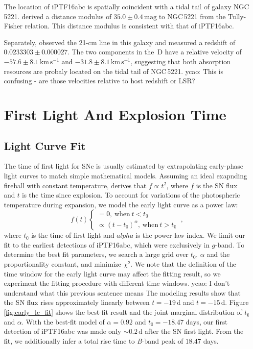 \documentclass[twocolumn]{aastex61}
\newcommand{\ycao}[1]{{\color{red} ycao: {#1}}}
\begin{document}
The location of iPTF16abc is spatially coincident with a tidal tail of
galaxy NGC\,5221. \citet{2007A&A...465...71T} derived a distance
modulus of $35.0\pm0.4\,\textrm{mag}$ to NGC\,5221 from the Tully-Fisher
relation. This distance modulus is consistent with that of iPTF16abc.

Separately, \citet{1998A&AS..130..333T} observed the 21-cm line in
this galaxy and measured a redshift of $0.0233303\pm0.000027$.  The
two components in the \,D have a relative velocity of
$-57.6\pm8.1\,\textrm{km}\,\textrm{s}^{-1}$ and
$-31.8\pm8.1\,\textrm{km}\,\textrm{s}^{-1}$, suggesting that both
absorption resources are probaly located on the tidal tail of
NGC\,5221.\ycao{This is confusing - are those velocities relative to host redshift or LSR?}


\section{First Light And Explosion Time}
\label{sec:first_light}

\subsection{Light Curve Fit}
\label{sec:lc_fit}

The time of first light for SNe is usually estimated by 
extrapolating early-phase light curves to match simple 
mathematical models. Assuming an ideal exapnding fireball with 
constant temperature, \citet{1982ApJ...253..785A} derives that $f 
\propto t^2$, where $f$ is the SN flux and $t$ is the time since 
explosion. To account for variations of the photospheric 
temperature during expansion, we model the early light curve as a power law:
\begin{equation}
  \label{eq:broken_power_law}
  f(t) \left\{
    \begin{array}{ll}
      = 0,\ \textrm{when}\ t<t_0 \\
      \propto (t-t_0)^{\alpha},\ \textrm{when}\ t>t_0
    \end{array}
  \right.\ ,
\end{equation}
where $t_0$ is the time of first light and $alpha$ is the power-law index. We limit our fit to the earliest detections of iPTF16abc, which were exclusively in $g$-band. To determine the best fit parameters, we search a large grid over $t_0$, $\alpha$
and the proportionality constant, and minimize $\chi^2$. 
We note that the definition of
the time window for the early light curve may affect the fitting
result, so we experiment the fitting procedure with different time
windows. \ycao{I don't understand what this previous sentence means}
The modeling results show that the SN flux rises approximately
linearly between
$t=-19\,\textrm{d}$ and $t=-15\,\textrm{d}$. Figure \ref{fig:early_lc_fit} shows the best-fit result and
the joint marginal distribution of $t_0$ and $\alpha$. With the
best-fit model of $\alpha=0.92$ and $t_0=-18.47$ days, our first
detection of iPTF16abc was made only $\sim{0.2}\,\textrm{d}$ after 
the SN first light. From the fit, we additionally infer a total rise time to \textit{B}-band peak of $18.47$
days.
\end{document}
